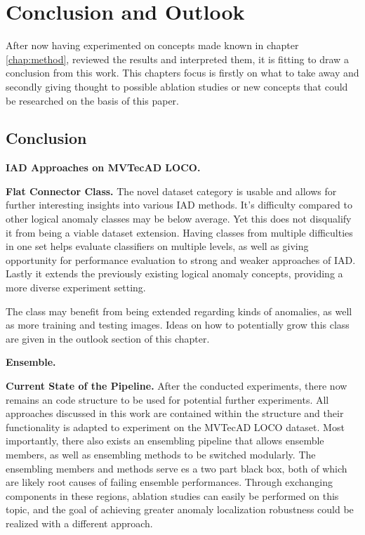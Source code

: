 \chapter{Conclusion and Outlook}
\label{chap:conclusion}


After now having experimented on concepts made known in chapter \ref{chap:method}, reviewed the results and interpreted them, it is 
fitting to draw a conclusion from this work. This chapters focus is firstly on what to take away and secondly giving thought to 
possible ablation studies or new concepts that could be researched on the basis of this paper.


\section{Conclusion}
\label{sec:realconclusion}

\textbf{IAD Approaches on MVTecAD LOCO.}

\textbf{Flat Connector Class.}
The novel dataset category is usable and allows for further interesting insights into various IAD methods. It's difficulty compared to other logical anomaly classes may be below average. Yet this does not disqualify it from being a viable dataset extension. Having classes from multiple difficulties in one set helps evaluate classifiers on multiple levels, as well as giving opportunity for performance evaluation to strong and weaker approaches of IAD. Lastly it extends the previously existing logical anomaly concepts, providing a more diverse experiment setting. \newline

The class may benefit from being extended regarding kinds of anomalies, as well as more training and testing images. Ideas on how to potentially grow this class are given in the outlook section of this chapter.

\textbf{Ensemble.}

\textbf{Current State of the Pipeline.}
After the conducted experiments, there now remains an code structure to be used for potential further experiments. 
All approaches discussed in this work are contained within the structure and their functionality is adapted to experiment on the MVTecAD LOCO \cite{LOCO...} dataset. Most importantly, there also exists an ensembling pipeline that allows ensemble members, as well as ensembling methods to be switched modularly. The ensembling members and methods serve es a two part black box, both of which are likely root causes of failing ensemble performances. 
Through exchanging components in these regions, ablation studies can easily be performed on this topic, and the goal of achieving greater anomaly localization robustness could be realized with a different approach.



